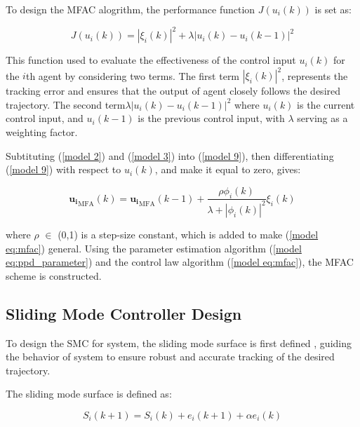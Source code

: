 \documentclass[journal,onecolumn]{IEEEtran}
\begin{document}
To design the MFAC alogrithm, the performance function \(J(u_i(k))\) is set as:

\begin{equation}
    \label{model 9}
    J(u_i(k)) = |\xi_i(k)|^2 + \lambda|u_i(k) - u_i(k-1)|^2
\end{equation}

This function used to evaluate the effectiveness of the control input \(u_i(k)\) for the $i$th agent by considering two terms. The first term \(|\xi_i(k)|^2\), represents the tracking error and ensures that the output of agent closely follows the desired trajectory. The second term\(\lambda|u_i(k) - u_i(k-1)|^2\) where \(u_i(k)\) is the current control input, and \(u_i(k-1)\) is the previous control input, with \(\lambda\) serving as a weighting factor.

Subtituting (\ref{model 2}) and (\ref{model 3}) into (\ref{model 9}), then differentiating (\ref{model 9}) with respect to \(u_i(k)\), and make it equal to zero, gives:

\begin{equation}
    \label{model eq:mfac}
    \mathbf{u_i}_{\text{MFA}}(k) = \mathbf{u_i}_{\text{MFA}}(k - 1) + \frac{\rho \phi_i(k)}{\lambda + |\phi_i(k)|^2} \xi_i(k)
\end{equation}


where \(\rho\) \(\in\) (0,1) is a step-size constant, which is added to make (\ref{model eq:mfac}) general. Using the parameter estimation algorithm (\ref{model eq:ppd_parameter}) and the control law algorithm (\ref{model eq:mfac}), the MFAC scheme is constructed. 


\subsection{Sliding Mode Controller Design}







To design the SMC for system, the sliding mode surface is first defined , guiding the behavior of system to ensure robust and accurate tracking of the desired trajectory.

The sliding mode surface is defined as:

\begin{equation}
    \label{model eq:sms}
    S_i(k+1) = S_i(k)+e_i(k+1)+\alpha e_i(k) 
\end{equation}
\end{document}

